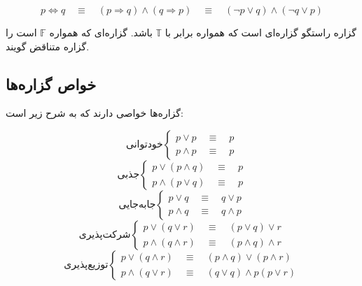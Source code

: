 \documentclass[a5paper]{article}
\newcommand{\T}{\mathbb{T}}
\newcommand{\F}{\mathbb{F}}
\begin{document}
\begin{equation}
p \Leftrightarrow q \quad \equiv \quad (p \Rightarrow q) \land (q \Rightarrow p) \quad \equiv \quad (\lnot p \lor q) \land (\lnot q \lor p)
\end{equation}

گزاره راستگو گزاره‌ای است که همواره برابر با $\T$ باشد.
گزاره‌ای که همواره $\F$ است را گزاره متناقض گویند.

\subsection{خواص گزاره‌ها}
گزاره‌ها خواصی دارند که به شرح زیر است:

\begin{equation}
  \text{خودتوانی}\begin{cases}
    p \lor p \quad \equiv \quad p \\
    p \land p \quad \equiv \quad p
  \end{cases}
\end{equation}
\begin{equation}
  \text{جذبی}\begin{cases}
    p \lor (p \land q) \quad \equiv \quad p \\
    p \land (p \lor q) \quad \equiv \quad p
  \end{cases}
\end{equation}
\begin{equation}
  \text{جابه‌جایی}\begin{cases}
    p \lor q \quad \equiv \quad q \lor p \\
    p \land q \quad \equiv \quad q \land p
  \end{cases}
\end{equation}
\begin{equation}
  \text{شرکت‌پذیری}\begin{cases}
    p \lor (q \lor r) \quad \equiv \quad (p \lor q) \lor r \\
    p \land (q \land r) \quad \equiv \quad (p \land q) \land r
  \end{cases}
\end{equation}
\begin{equation}
  \text{توزیع‌پذیری}\begin{cases}
    p \lor (q \land r) \quad \equiv \quad (p \land q) \lor (p \land r) \\
    p \land (q \lor r) \quad \equiv \quad (q \lor q) \land p (p \lor r)
  \end{cases}
\end{equation}
\end{document}
